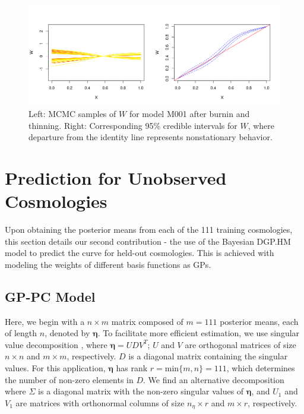 \documentclass[11pt]{article}
\begin{document}
\begin{figure}[ht]
   \centering
   \includegraphics[width=6in]{plot_warp_M001.png}
   \caption{Left: MCMC samples of $W$ for model M001 after burnin and thinning. Right: Corresponding 95\% credible intervals for $W$, where departure from the identity line represents nonstationary behavior.}
   \label{fig:plot_warp}
\end{figure}

\section{Prediction for Unobserved Cosmologies}
\label{sec:pred}

Upon obtaining the posterior means from each of the 111 training cosmologies, this section details our second contribution - the use of the Bayesian DGP.HM model to predict the curve for held-out cosmologies. This is achieved with modeling the weights of different basis functions as GPs.

\subsection{GP-PC Model}
\label{subsec:pca}

Here, we begin with a $n \times m$ matrix composed of $m=111$ posterior means, each of length $n$, denoted by $\boldsymbol\eta$. To facilitate more efficient estimation, we use singular value decomposition \citep[SVD; e.g.,][]{banerjee2014linear}, where $\boldsymbol\eta = UDV^T$; $U$ and $V$ are orthogonal matrices of size $n \times n$ and  $m\times m$, respectively. $D$ is a diagonal matrix containing the singular values. For this application, $\boldsymbol\eta$ has rank $r=\text{min}\{m,n\}=111$, which determines the number of non-zero elements in $D$. We find an alternative decomposition where $\Sigma$ is a diagonal matrix with the non-zero singular values of $\boldsymbol\eta$, and $U_1$ and $V_1$ are matrices with orthonormal columns of size $n_\eta \times r$ and $m \times r$, respectively. 
\end{document}
